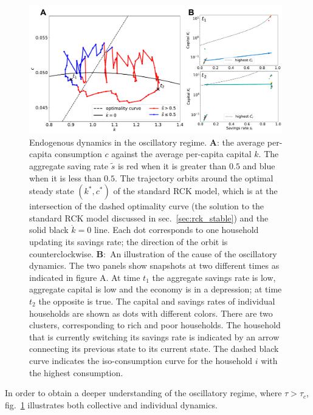 \begin{figure}[t]
     \centering
       \includegraphics[width=0.98\textwidth]
       {figures/fig3.pdf}
       \caption{{ Endogenous dynamics in the oscillatory regime. } \textbf{A}: the average per-capita consumption $c$ against the average per-capita capital $k$. The aggregate saving rate $\tilde{s}$ is red when it is greater than $0.5$ and blue when it is less than $0.5$. The trajectory orbits around the optimal steady state $(k^\ast,c^\ast)$  of the standard RCK model, which is at the intersection of the dashed optimality curve (the solution to the standard RCK model discussed in sec.~\ref{sec:rck_stable}) and the solid black $\dot{k}=0$ line. Each dot corresponds to one household updating its savings rate; the direction of the orbit is counterclockwise.
\textbf{B}:~An illustration of the cause of the oscillatory dynamics.  The two panels show snapshots at two different times as indicated in figure A.  At time $t_1$ the aggregate savings rate is low, aggregate capital is low and the economy is in a depression; at time $t_2$ the opposite is true.  The capital and savings rates of individual households are shown as dots with different colors.  There are two clusters, corresponding to rich and poor households.  The household that is currently switching its savings rate is indicated by an arrow connecting its previous state to its current state.  The dashed black curve indicates the iso-consumption curve for the household $i$ with the highest consumption. }
\label{fig:dynamics}
\end{figure} 


In order to obtain a deeper understanding of the oscillatory regime, where $\tau > \tau_{c}$, fig.~\ref{fig:dynamics} illustrates both collective and individual dynamics.

